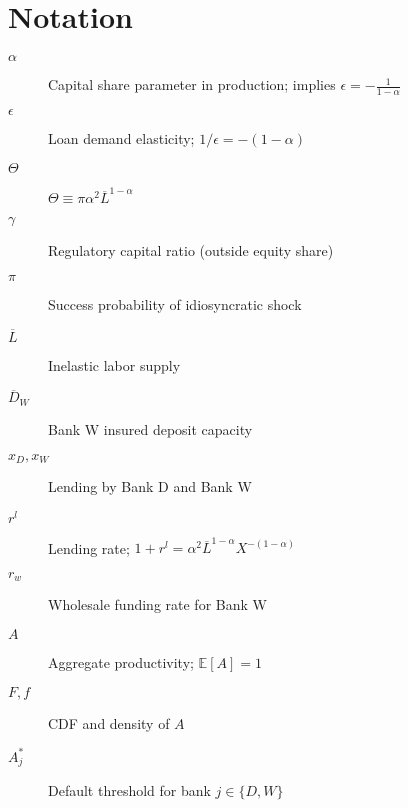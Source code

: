 \documentclass[12pt]{article}
\begin{document}
\section{Notation}
\label{app:notation}
\begin{description}
    \item[$\alpha$] Capital share parameter in production; implies $\epsilon = -\frac{1}{1-\alpha}$
    \item[$\epsilon$] Loan demand elasticity; $1/\epsilon = -(1-\alpha)$
    \item[$\Theta$] $\Theta \equiv \pi\alpha^{2}\overline{L}^{1-\alpha}$
    \item[$\gamma$] Regulatory capital ratio (outside equity share)
    \item[$\pi$] Success probability of idiosyncratic shock
    \item[$\overline{L}$] Inelastic labor supply
    \item[$\overline{D}_{W}$] Bank W insured deposit capacity
    \item[$x_{D}, x_{W}$] Lending by Bank D and Bank W
    \item[$r^{l}$] Lending rate; $1+r^{l} = \alpha^{2}\overline{L}^{1-\alpha}X^{-(1-\alpha)}$
    \item[$r_{w}$] Wholesale funding rate for Bank W
    \item[$A$] Aggregate productivity; $\mathbb{E}[A]=1$
    \item[$F, f$] CDF and density of $A$
    \item[$A_{j}^{*}$] Default threshold for bank $j \in \{D,W\}$
\end{description}
\end{document}
